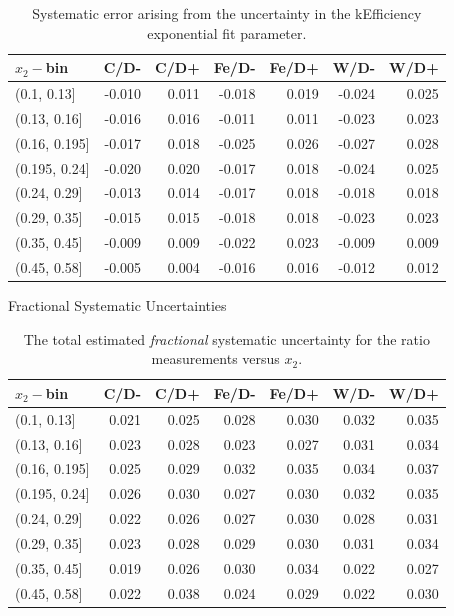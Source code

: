 \begin{table}
	\centering
	\begin{tabular}{lrrrrrr}
		\toprule
		$x_2-$bin &   C/D- &   C/D+ &  Fe/D- &  Fe/D+ &   W/D- &   W/D+ \\
		\midrule
		(0.1, 0.13]   & -0.010 &  0.011 & -0.018 &  0.019 & -0.024 &  0.025 \\
		(0.13, 0.16]  & -0.016 &  0.016 & -0.011 &  0.011 & -0.023 &  0.023 \\
		(0.16, 0.195] & -0.017 &  0.018 & -0.025 &  0.026 & -0.027 &  0.028 \\
		(0.195, 0.24] & -0.020 &  0.020 & -0.017 &  0.018 & -0.024 &  0.025 \\
		(0.24, 0.29]  & -0.013 &  0.014 & -0.017 &  0.018 & -0.018 &  0.018 \\
		(0.29, 0.35]  & -0.015 &  0.015 & -0.018 &  0.018 & -0.023 &  0.023 \\
		(0.35, 0.45]  & -0.009 &  0.009 & -0.022 &  0.023 & -0.009 &  0.009 \\
		(0.45, 0.58]  &  -0.005 & 0.004 & -0.016 &  0.016 & -0.012 &  0.012 \\
		\bottomrule
	\end{tabular}
	\caption{Systematic error arising from the uncertainty in the kEfficiency exponential fit parameter.}
	\label{tab:sys-keff}
\end{table}

\begin{table}
	\centering
	\caption*{Fractional Systematic Uncertainties}
	\begin{tabular}{lrrrrrr}
		\toprule
		$x_2-$bin &   C/D- &   C/D+ &  Fe/D- &  Fe/D+ &   W/D- &   W/D+ \\
		\midrule
		(0.1, 0.13]   &  0.021 &  0.025 &  0.028 &  0.030 &  0.032 &  0.035 \\
		(0.13, 0.16]  &  0.023 &  0.028 &  0.023 &  0.027 &  0.031 &  0.034 \\
		(0.16, 0.195] &  0.025 &  0.029 &  0.032 &  0.035 &  0.034 &  0.037 \\
		(0.195, 0.24] &  0.026 &  0.030 &  0.027 &  0.030 &  0.032 &  0.035 \\
		(0.24, 0.29]  &  0.022 &  0.026 &  0.027 &  0.030 &  0.028 &  0.031 \\
		(0.29, 0.35]  &  0.023 &  0.028 &  0.029 &  0.030 &  0.031 &  0.034 \\
		(0.35, 0.45]  &  0.019 &  0.026 &  0.030 &  0.034 &  0.022 &  0.027 \\
		(0.45, 0.58]  &  0.022 &  0.038 &  0.024 &  0.029 &  0.022 &  0.030 \\
		\bottomrule
	\end{tabular}
	\caption{The total estimated \emph{fractional} systematic uncertainty for the ratio measurements versus $x_2$.}
	\label{tab:total-sys}
\end{table}

